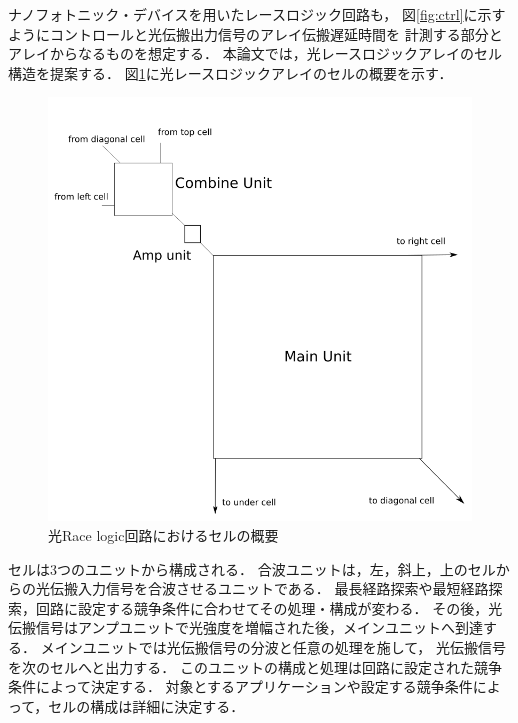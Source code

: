 ナノフォトニック・デバイスを用いたレースロジック回路も，
図\ref{fig:ctrl}に示すようにコントロールと光伝搬出力信号のアレイ伝搬遅延時間を
計測する部分とアレイからなるものを想定する．
本論文では，光レースロジックアレイのセル構造を提案する．
図\ref{fig:lightracelogiccell}に光レースロジックアレイのセルの概要を示す．
\begin{figure}[t!]
\begin{center}
\includegraphics[keepaspectratio,scale=0.5]{fig/3/lightracelogic_cell_1.png}
\caption{光Race logic回路におけるセルの概要}
\label{fig:lightracelogiccell}
\end{center}
\end{figure}

セルは3つのユニットから構成される．
合波ユニットは，左，斜上，上のセルからの光伝搬入力信号を合波させるユニットである．
最長経路探索や最短経路探索，回路に設定する競争条件に合わせてその処理・構成が変わる．
その後，光伝搬信号はアンプユニットで光強度を増幅された後，メインユニットへ到達する．
メインユニットでは光伝搬信号の分波と任意の処理を施して，
光伝搬信号を次のセルへと出力する．
このユニットの構成と処理は回路に設定された競争条件によって決定する．
対象とするアプリケーションや設定する競争条件によって，セルの構成は詳細に決定する．

